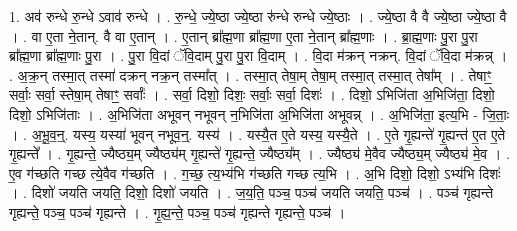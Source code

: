 \documentclass[17pt]{extarticle}
\begin{document}
1. अव॑ रुन्धे रु॒न्धे ऽवाव॑ रुन्धे । . रु॒न्धे॒ ज्ये॒ष्ठा ज्ये॒ष्ठा रु॑न्धे रुन्धे ज्ये॒ष्ठाः । . ज्ये॒ष्ठा वै वै ज्ये॒ष्ठा ज्ये॒ष्ठा वै । . वा ए॒ता ने॒तान्. वै वा ए॒तान् । . ए॒तान् ब्रा᳚ह्म॒णा ब्रा᳚ह्म॒णा ए॒ता ने॒तान् ब्रा᳚ह्म॒णाः । . ब्रा॒ह्म॒णाः पु॒रा पु॒रा ब्रा᳚ह्म॒णा ब्रा᳚ह्म॒णाः पु॒रा । . पु॒रा वि॒दां ॅवि॒दाम् पु॒रा पु॒रा वि॒दाम् । . वि॒दा म॑क्रन् नक्रन्. वि॒दां ॅवि॒दा म॑क्रन्न् । . अ॒क्र॒न् तस्मा॒त् तस्मा॑ दक्रन् नक्र॒न् तस्मा᳚त् । . तस्मा॒त् तेषा॒म् तेषा॒म् तस्मा॒त् तस्मा॒त् तेषा᳚म् । . तेषाꣳ॒॒ सर्वाः॒ सर्वा॒ स्तेषा॒म् तेषाꣳ॒॒ सर्वाः᳚ । . सर्वा॒ दिशो॒ दिशः॒ सर्वाः॒ सर्वा॒ दिशः॑ । . दिशो॒ ऽभिजि॑ता अ॒भिजि॑ता॒ दिशो॒ दिशो॒ ऽभिजि॑ताः । . अ॒भिजि॑ता अभूवन् नभूवन् न॒भिजि॑ता अ॒भिजि॑ता अभूवन्न् । . अ॒भिजि॑ता॒ इत्य॒भि - जि॒ताः॒ । . अ॒भू॒व॒न्॒. यस्य॒ यस्या॑ भूवन् नभूव॒न्॒. यस्य॑ । . यस्यै॒त ए॒ते यस्य॒ यस्यै॒ते । . ए॒ते गृ॒ह्यन्ते॑ गृ॒ह्यन्त॑ ए॒त ए॒ते गृ॒ह्यन्ते᳚ । . गृ॒ह्यन्ते॒ ज्यैष्ठ्य॒म् ज्यैष्ठ्य॑म् गृ॒ह्यन्ते॑ गृ॒ह्यन्ते॒ ज्यैष्ठ्य᳚म् । . ज्यैष्ठ्य॑ मे॒वैव ज्यैष्ठ्य॒म् ज्यैष्ठ्य॑ मे॒व । . ए॒व ग॑च्छति गच्छ त्ये॒वैव ग॑च्छति । . ग॒च्छ॒ त्य॒भ्य॑भि ग॑च्छति गच्छ त्य॒भि । . अ॒भि दिशो॒ दिशो॒ ऽभ्य॑भि दिशः॑ । . दिशो॑ जयति जयति॒ दिशो॒ दिशो॑ जयति । . ज॒य॒ति॒ पञ्च॒ पञ्च॑ जयति जयति॒ पञ्च॑ । . पञ्च॑ गृह्यन्ते गृह्यन्ते॒ पञ्च॒ पञ्च॑ गृह्यन्ते । . गृ॒ह्य॒न्ते॒ पञ्च॒ पञ्च॑ गृह्यन्ते गृह्यन्ते॒ पञ्च॑ । \newline
\end{document}
